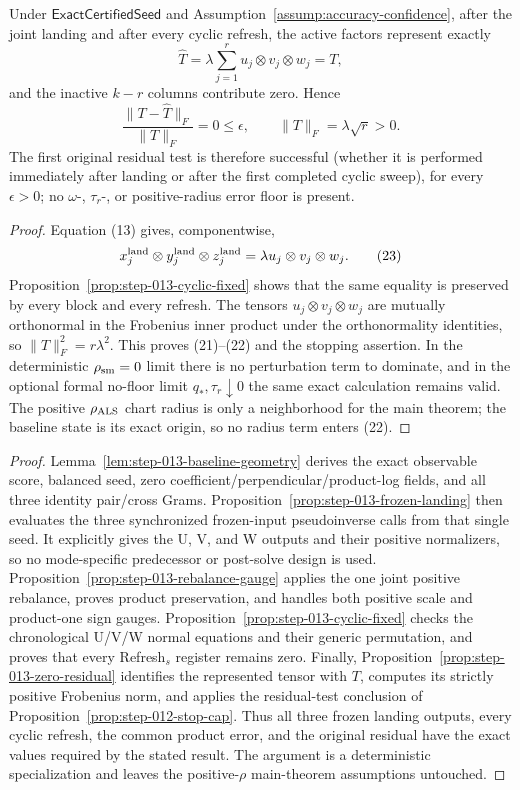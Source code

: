 \begin{proposition}\label{prop:step-013-zero-residual}
Under \(\mathsf{ExactCertifiedSeed}\) and
Assumption~\ref{assump:accuracy-confidence}, after the joint landing and
after every cyclic refresh, the active factors represent exactly
\[
\widehat T
=\lambda\sum_{j=1}^r u_j\otimes v_j\otimes w_j=T,
\tag{21}
\]
and the inactive \(k-r\) columns contribute zero. Hence
\[
\frac{\|T-\widehat T\|_F}{\|T\|_F}=0\le\epsilon,\qquad
\|T\|_F=\lambda\sqrt r>0.
\tag{22}
\]
The first original residual test is therefore successful (whether it is
performed immediately after landing or after the first completed cyclic
sweep), for every \(\epsilon>0\); no \(\omega\)-, \(\tau_r\)-, or positive-radius
error floor is present.

\begin{proof}
Equation (13) gives, componentwise,
\[
x_j^{\rm land}\otimes y_j^{\rm land}\otimes z_j^{\rm land}
=\lambda u_j\otimes v_j\otimes w_j.
\tag{23}
\]
Proposition~\ref{prop:step-013-cyclic-fixed} shows that the same equality is
preserved by every block and every refresh. The tensors
\(u_j\otimes v_j\otimes w_j\) are mutually orthonormal in the Frobenius inner
product under the orthonormality identities, so \(\|T\|_F^2=r\lambda^2\). This proves (21)--(22) and
the stopping assertion. In the deterministic \(\rho_{\rm sm}=0\) limit
there is no perturbation term to dominate, and in the optional formal
no-floor limit \(q_*,\tau_r\downarrow0\) the same exact calculation remains
valid. The positive \(\rho_{\rm ALS}\) chart radius is only a neighborhood
for the main theorem; the baseline state is its exact origin, so no radius
term enters (22).


\end{proof}
\end{proposition}
\begin{proof}
Lemma~\ref{lem:step-013-baseline-geometry} derives the exact observable score,
balanced seed, zero coefficient/perpendicular/product-log fields, and all
three identity pair/cross Grams. Proposition~\ref{prop:step-013-frozen-landing}
then evaluates the three synchronized frozen-input pseudoinverse calls from
that single seed. It explicitly gives the U, V, and W outputs and their
positive normalizers, so no mode-specific predecessor or post-solve design is
used. Proposition~\ref{prop:step-013-rebalance-gauge} applies the one joint
positive rebalance, proves product preservation, and handles both positive
scale and product-one sign gauges. Proposition~\ref{prop:step-013-cyclic-fixed}
checks the chronological U/V/W normal equations and their generic permutation,
and proves that every Refresh$_s$ register remains zero. Finally,
Proposition~\ref{prop:step-013-zero-residual} identifies the represented tensor
with \(T\), computes its strictly positive Frobenius norm, and applies the
residual-test conclusion of Proposition~\ref{prop:step-012-stop-cap}. Thus all three frozen landing
outputs, every cyclic refresh, the common product error, and the original
residual have the exact values required by the stated result. The argument is a
deterministic specialization and leaves the positive-\(\rho\) main-theorem
assumptions untouched.
\end{proof}

